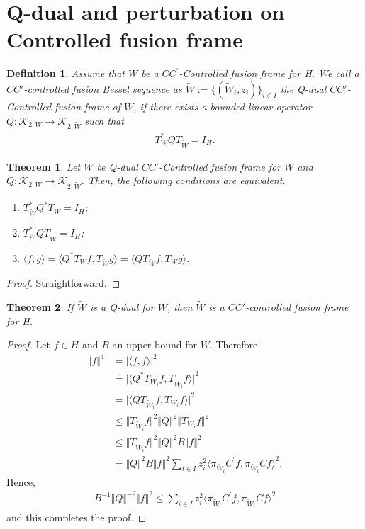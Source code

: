 \documentclass{mfatshort}
\newtheorem{theorem}{Theorem}[section]
\newtheorem{definition}{Definition}
\begin{document}
\section{ Q-dual and perturbation  on Controlled fusion frame}
\begin{definition}
Assume that $W$ be a $CC^{\prime}$-Controlled fusion frame  for H. We call a  $CC'$-controlled fusion Bessel sequence  as $\tilde{W}:=\{(\tilde{W}_i, z_i)\}_{i\in I}$ the Q-dual $CC'$-Controlled fusion frame  of  $W$,  if there exists a bounded linear operator $Q:\mathcal{K}_{2,W}\longrightarrow \mathcal{K}_{2,\tilde{W}}$ such that
\begin{align*}
T^{*}_{W}QT_{\tilde{W}}=I_{H}.
\end{align*}
\end{definition}
\begin{theorem}
Let  $\tilde{W}$ be Q-dual $CC'$-Controlled fusion frame for $W$  and  $Q:\mathcal{K}_{2,W}\longrightarrow \mathcal{K}_{2,\tilde{W}}$. Then, the following conditions are equivalent.
\begin{enumerate}
\item $T^{*}_{\tilde{W}}Q^{*} T_ {W}=I_{H}$;
\item $T^{*}_ {W}QT_{\tilde{W}}=I_{H}$;
\item $\langle f,g \rangle = \langle Q^{*} T_ {W}f,T_{\tilde{W}}g \rangle=\langle Q T_{\tilde{W}}f,T_ {W}g \rangle$.
\end{enumerate}
\end{theorem}
\begin{proof}
Straightforward.
\end{proof}
\begin{theorem}
If  $\tilde{W}$ is a Q-dual for $W$, then  $\tilde{W}$ is a $CC'$-controlled fusion frame  for H.
\end{theorem}
\begin{proof}
Let $f\in H$ and $B$ an upper bound for $W$. Therefore
\begin{align*}
\Vert f\Vert ^{4}&=\vert\langle f,f \rangle\vert^{2}\\
&=\vert\langle Q^{*} T_ {W_{i}}f, T_{\tilde{W}_{i}}f\rangle\vert^{2}\\
&=\vert\langle QT_{\tilde{W}_{i}} f,T_ {W_{i}}f\rangle\vert^{2}\\
&\leq \Vert T_ {\tilde{W}_{i}}f \Vert^{2} \Vert Q\Vert ^{2} \Vert T_ {W_{i}}f \Vert ^{2}\\
&\leq \Vert T_ {\tilde{W}_{i}}f \Vert^{2} \Vert Q \Vert^{2} B \Vert f \Vert^{2}\\
&=\Vert Q \Vert^{2} B \Vert f \Vert^{2}\sum _{i\in I} z_{i}^{2} \langle \pi_{\tilde{W}_{i}} C^{\prime}f,\pi_{\tilde{W}_{i}} Cf \rangle ^{2}.
\end{align*}
Hence,
\begin{align*}
B^{-1} \Vert Q \Vert^{-2}\Vert f\Vert ^{2}\leq \sum _{i\in I} z_{i}^{2} \langle \pi_{\tilde{W}_{i}} C^{\prime}f,\pi_{\tilde{W}_{i}} Cf \rangle ^{2}
\end{align*}
and this completes the proof.
\end{proof}
\end{document}
